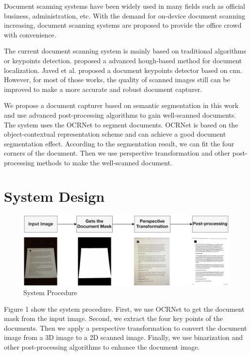 \documentclass[10pt, conference, compsocconf]{IEEEtran}
\begin{document}

Document scanning systems have been widely used in many fields such as official business, administration, etc. 
With the demand for on-device document scanning increasing, document scanning systems are proposed to provide the office crowd with convenience. 

The current document scanning system is mainly based on traditional algorithms or keypoints detection.  \cite{Tropin2021AdvancedHM} proposed a advanced hough-based method for document localization. Javed et al.\cite{javed2017real} proposed a document keypoints detector based on cnn.
However, for most of those works, the quality of scanned images still can be improved to make a more accurate and robust document capturer.

We propose a document capturer based on semantic segmentation in this work and use advanced post-processing algorithms to gain well-scanned documents.
The system uses the OCRNet\cite{yuan2020object} to segment documents. 
OCRNet is based on the object-contextual representation scheme and can achieve a good document segmentation effect. According to the segmentation result, we can fit the four corners of the document. Then we use perspective transformation\cite{lin2010image} and other post-processing methods to make the well-scanned document.

\section{System Design}

\begin{figure}[!h]
\centering
\includegraphics[width=3.2 in]{./Assets/FlowChart.jpg}
\caption{System Procedure}
\end{figure}



Figure 1 show the system procedure.
First, we use OCRNet\cite{yuan2020object} to get the document mask from the input image.
Second, we extract the four key points of the documents.
Then we apply a perspective transformation to convert the document image from a 3D image to a 2D scanned image.
Finally, we use binarization and other post-processing algorithms to enhance the document image. 
\end{document}
